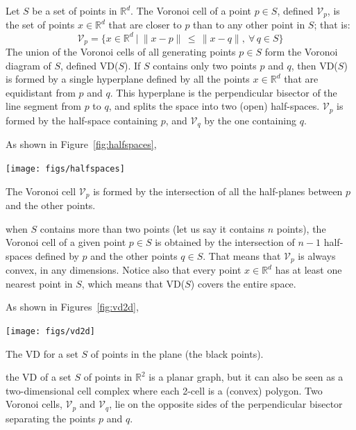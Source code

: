 Let $S$ be a set of points in $\mathbb{R}^d$. 
The Voronoi cell of a point $p \in S$, defined $\mathcal{V}_{p}$, is the set of points $x \in \mathbb{R}^d$ that are closer to $p$ than to any other point in $S$; that is:
\begin{equation}
\mathcal{V}_p = \{x \in \mathbb{R}^{d} \ | \ \|x-p\| \, \leq \, \|x-q\|, \ \forall \, q \in S \} 
\end{equation}
The union of the Voronoi cells of all generating points $p \in S$ form the Voronoi diagram of $S$, defined VD($S$). 
If $S$ contains only two points $p$ and $q$, then VD($S$) is formed by a single hyperplane defined by all the points $x \in \mathbb{R}^d$ that are equidistant from $p$ and $q$. 
This hyperplane is the perpendicular bisector of the line segment from $p$ to $q$, and splits the space into two (open) half-spaces. 
$\mathcal{V}_p$ is formed by the half-space containing $p$, and $\mathcal{V}_q$ by the one containing $q$. 

%

As shown in Figure~\ref{fig:halfspaces}, 
\begin{marginfigure}
  \centering
  \texttt{[image: figs/halfspaces]}
  \caption[A Voronoi cell]{The Voronoi cell $\mathcal{V}_p$ is formed by the intersection of all the half-planes between $p$ and the other points.}%
\label{fig:halfspaces}
\end{marginfigure}
when $S$ contains more than two points (let us say it contains $n$ points), the Voronoi cell of a given point $p \in S$ is obtained by the intersection of $n-1$ half-spaces defined by $p$ and the other points $q \in S$. 
That means that $\mathcal{V}_{p}$ is always convex, in any dimensions. Notice also that every point $x \in \mathbb{R}^d$ has at least one nearest point in $S$, which means that VD($S$) covers the entire space.

%

As shown in Figures~\ref{fig:vd2d}, 
\begin{marginfigure}
  \centering
  \texttt{[image: figs/vd2d]}
  \caption[The VD for a set of points in the plane]{The VD for a set $S$ of points in the plane (the black points).}%
\label{fig:vd2d}
\end{marginfigure}
the VD of a set $S$ of points in $\mathbb{R}^2$ is a planar graph, but it can also be seen as a two-dimensional cell complex where each 2-cell is a (convex) polygon. 
Two Voronoi cells, $\mathcal{V}_{p}$ and $\mathcal{V}_{q}$, lie on the opposite sides of the perpendicular bisector separating the points $p$ and $q$. 

